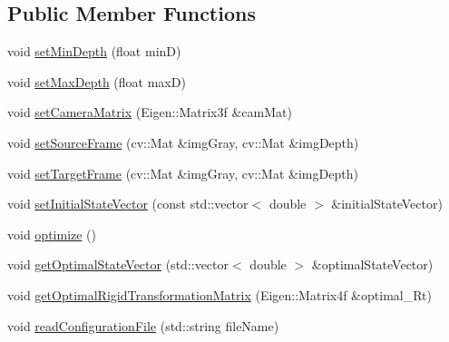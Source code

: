 \subsection*{Public Member Functions}
\begin{DoxyCompactItemize}
\item 
void \hyperlink{class_photoconsistency_odometry_1_1_analytic_1_1_c_photoconsistency_odometry_analytic_af473a25172cf498f50cec44b697f8e81}{setMinDepth} (float minD)
\item 
void \hyperlink{class_photoconsistency_odometry_1_1_analytic_1_1_c_photoconsistency_odometry_analytic_a5553935095782a68830efa1d4f4ccce5}{setMaxDepth} (float maxD)
\item 
void \hyperlink{class_photoconsistency_odometry_1_1_analytic_1_1_c_photoconsistency_odometry_analytic_af55a42286ff6f056ad33103dd7c3b0a9}{setCameraMatrix} (Eigen::Matrix3f \&camMat)
\item 
void \hyperlink{class_photoconsistency_odometry_1_1_analytic_1_1_c_photoconsistency_odometry_analytic_a540df6929640bf7c1c248e27cc952772}{setSourceFrame} (cv::Mat \&imgGray, cv::Mat \&imgDepth)
\item 
void \hyperlink{class_photoconsistency_odometry_1_1_analytic_1_1_c_photoconsistency_odometry_analytic_a820824acdf3019f17ba889d0455e7f9c}{setTargetFrame} (cv::Mat \&imgGray, cv::Mat \&imgDepth)
\item 
void \hyperlink{class_photoconsistency_odometry_1_1_analytic_1_1_c_photoconsistency_odometry_analytic_a6765ca12e063b199624e408fe07d2c13}{setInitialStateVector} (const std::vector$<$ double $>$ \&initialStateVector)
\item 
void \hyperlink{class_photoconsistency_odometry_1_1_analytic_1_1_c_photoconsistency_odometry_analytic_aadf26b26688281cd18375984c1cc719e}{optimize} ()
\item 
void \hyperlink{class_photoconsistency_odometry_1_1_analytic_1_1_c_photoconsistency_odometry_analytic_ad48c2851da3b626484d2d005b81d9b4e}{getOptimalStateVector} (std::vector$<$ double $>$ \&optimalStateVector)
\item 
void \hyperlink{class_photoconsistency_odometry_1_1_analytic_1_1_c_photoconsistency_odometry_analytic_a48873715c3dc7a6ad8e8359d7c03254d}{getOptimalRigidTransformationMatrix} (Eigen::Matrix4f \&optimal\_\-Rt)
\item 
void \hyperlink{class_photoconsistency_odometry_1_1_analytic_1_1_c_photoconsistency_odometry_analytic_a96b148bbad6c72053fc93366bb0085d2}{readConfigurationFile} (std::string fileName)
\end{DoxyCompactItemize}
